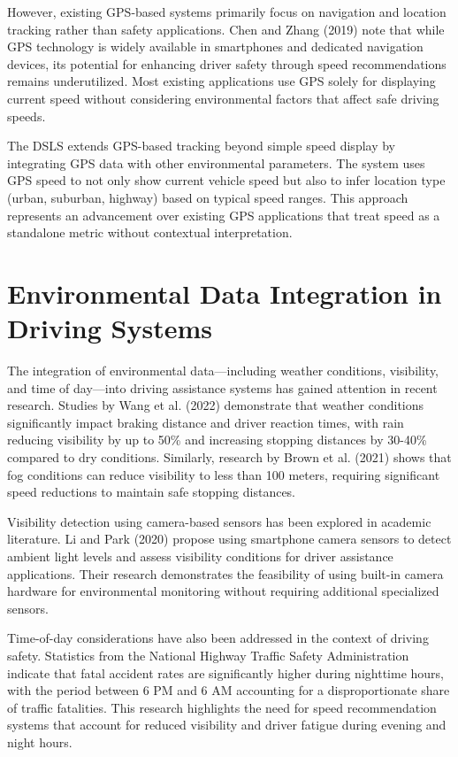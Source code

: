 However, existing GPS-based systems primarily focus on navigation and location tracking rather than safety applications. Chen and Zhang (2019) note that while GPS technology is widely available in smartphones and dedicated navigation devices, its potential for enhancing driver safety through speed recommendations remains underutilized. Most existing applications use GPS solely for displaying current speed without considering environmental factors that affect safe driving speeds.

The DSLS extends GPS-based tracking beyond simple speed display by integrating GPS data with other environmental parameters. The system uses GPS speed to not only show current vehicle speed but also to infer location type (urban, suburban, highway) based on typical speed ranges. This approach represents an advancement over existing GPS applications that treat speed as a standalone metric without contextual interpretation.

\section{Environmental Data Integration in Driving Systems}
The integration of environmental data—including weather conditions, visibility, and time of day—into driving assistance systems has gained attention in recent research. Studies by Wang et al. (2022) demonstrate that weather conditions significantly impact braking distance and driver reaction times, with rain reducing visibility by up to 50\% and increasing stopping distances by 30-40\% compared to dry conditions. Similarly, research by Brown et al. (2021) shows that fog conditions can reduce visibility to less than 100 meters, requiring significant speed reductions to maintain safe stopping distances.

Visibility detection using camera-based sensors has been explored in academic literature. Li and Park (2020) propose using smartphone camera sensors to detect ambient light levels and assess visibility conditions for driver assistance applications. Their research demonstrates the feasibility of using built-in camera hardware for environmental monitoring without requiring additional specialized sensors.

Time-of-day considerations have also been addressed in the context of driving safety. Statistics from the National Highway Traffic Safety Administration indicate that fatal accident rates are significantly higher during nighttime hours, with the period between 6 PM and 6 AM accounting for a disproportionate share of traffic fatalities. This research highlights the need for speed recommendation systems that account for reduced visibility and driver fatigue during evening and night hours.


